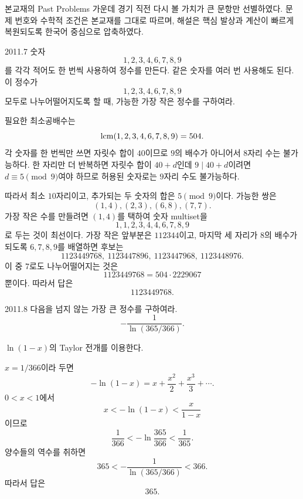
본교재의 Past Problems 가운데 경기 직전 다시 볼 가치가 큰 문항만 선별하였다. 문제 번호와 수학적 조건은 본교재를 그대로 따르며, 해설은 핵심 발상과 계산이 빠르게 복원되도록 한국어 중심으로 압축하였다.

\begin{pastproblem}{2011.7}
숫자
\[
1,2,3,4,6,7,8,9
\]
를 각각 적어도 한 번씩 사용하여 정수를 만든다. 같은 숫자를 여러 번 사용해도 된다. 이 정수가
\[
1,2,3,4,6,7,8,9
\]
모두로 나누어떨어지도록 할 때, 가능한 가장 작은 정수를 구하여라.
\end{pastproblem}

\begin{solution}
필요한 최소공배수는
\[
\operatorname{lcm}(1,2,3,4,6,7,8,9)=504.
\]
각 숫자를 한 번씩만 쓰면 자릿수 합이 $40$이므로 $9$의 배수가 아니어서 $8$자리 수는 불가능하다. 한 자리만 더 반복하면 자릿수 합이 $40+d$인데 $9\mid 40+d$이려면 $d\equiv5\pmod9$여야 하므로 허용된 숫자로는 $9$자리 수도 불가능하다.

따라서 최소 $10$자리이고, 추가되는 두 숫자의 합은 $5\pmod9$이다. 가능한 쌍은
\[
(1,4),(2,3),(6,8),(7,7).
\]
가장 작은 수를 만들려면 $(1,4)$를 택하여 숫자 multiset을
\[
1,1,2,3,4,4,6,7,8,9
\]
로 두는 것이 최선이다. 가장 작은 앞부분은 $112344$이고, 마지막 세 자리가 $8$의 배수가 되도록 $6,7,8,9$를 배열하면 후보는
\[
1123449768,\ 1123447896,\ 1123447968,\ 1123448976.
\]
이 중 $7$로도 나누어떨어지는 것은
\[
1123449768=504\cdot2229067
\]
뿐이다. 따라서 답은
\[
\boxed{1123449768}.
\]
\end{solution}

\begin{pastproblem}{2011.8}
다음을 넘지 않는 가장 큰 정수를 구하여라.
\[
-\frac{1}{\ln(365/366)}.
\]
\begin{hint}
$\ln(1-x)$의 Taylor 전개를 이용한다.
\end{hint}
\end{pastproblem}

\begin{solution}
$x=1/366$이라 두면
\[
-\ln(1-x)=x+\frac{x^2}{2}+\frac{x^3}{3}+\cdots.
\]
$0<x<1$에서
\[
x<-\ln(1-x)<\frac{x}{1-x}
\]
이므로
\[
\frac1{366}<-\ln\frac{365}{366}<\frac1{365}.
\]
양수들의 역수를 취하면
\[
365<-\frac1{\ln(365/366)}<366.
\]
따라서 답은
\[
\boxed{365}.
\]
\end{solution}

